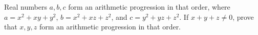 Real numbers $a,b,c$ form an arithmetic progression in that order, where $a=x^2+xy+y^2$, $b=x^2+xz+z^2$, and $c=y^2+yz+z^2$. If $x+y+z\ne0$, prove that $x,y,z$ form an arithmetic progression in that order.
